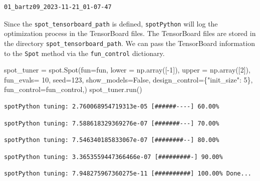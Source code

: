 \documentclass[
  letterpaper,
  DIV=11,
  numbers=noendperiod]{scrreprt}
\newenvironment{Shaded}{\begin{snugshade}}{\end{snugshade}}
\newcommand{\DecValTok}[1]{\textcolor[rgb]{0.68,0.00,0.00}{#1}}
\newcommand{\NormalTok}[1]{\textcolor[rgb]{0.00,0.23,0.31}{#1}}
\newcommand{\OperatorTok}[1]{\textcolor[rgb]{0.37,0.37,0.37}{#1}}
\newcommand{\StringTok}[1]{\textcolor[rgb]{0.13,0.47,0.30}{#1}}
\newcommand{\VariableTok}[1]{\textcolor[rgb]{0.07,0.07,0.07}{#1}}
\begin{document}
\begin{verbatim}
01_bartz09_2023-11-21_01-07-47
\end{verbatim}

Since the \texttt{spot\_tensorboard\_path} is defined,
\texttt{spotPython} will log the optimization process in the TensorBoard
files. The TensorBoard files are stored in the directory
\texttt{spot\_tensorboard\_path}. We can pass the TensorBoard
information to the \texttt{Spot} method via the \texttt{fun\_control}
dictionary.

\begin{Shaded}
\begin{Highlighting}[]
\NormalTok{spot\_tuner }\OperatorTok{=}\NormalTok{ spot.Spot(fun}\OperatorTok{=}\NormalTok{fun,}
\NormalTok{                   lower }\OperatorTok{=}\NormalTok{ np.array([}\OperatorTok{{-}}\DecValTok{1}\NormalTok{]),}
\NormalTok{                   upper }\OperatorTok{=}\NormalTok{ np.array([}\DecValTok{2}\NormalTok{]),}
\NormalTok{                   fun\_evals}\OperatorTok{=} \DecValTok{10}\NormalTok{,}
\NormalTok{                   seed}\OperatorTok{=}\DecValTok{123}\NormalTok{,}
\NormalTok{                   show\_models}\OperatorTok{=}\VariableTok{False}\NormalTok{,}
\NormalTok{                   design\_control}\OperatorTok{=}\NormalTok{\{}\StringTok{"init\_size"}\NormalTok{: }\DecValTok{5}\NormalTok{\},}
\NormalTok{                   fun\_control}\OperatorTok{=}\NormalTok{fun\_control,)}
\NormalTok{spot\_tuner.run()}
\end{Highlighting}
\end{Shaded}

\begin{verbatim}
spotPython tuning: 2.760068954719313e-05 [######----] 60.00% 
\end{verbatim}

\begin{verbatim}
spotPython tuning: 7.588618329369276e-07 [#######---] 70.00% 
\end{verbatim}

\begin{verbatim}
spotPython tuning: 7.546340185833067e-07 [########--] 80.00% 
\end{verbatim}

\begin{verbatim}
spotPython tuning: 3.3653559447366466e-07 [#########-] 90.00% 
\end{verbatim}

\begin{verbatim}
spotPython tuning: 7.948275967360275e-11 [##########] 100.00% Done...
\end{verbatim}
\end{document}
